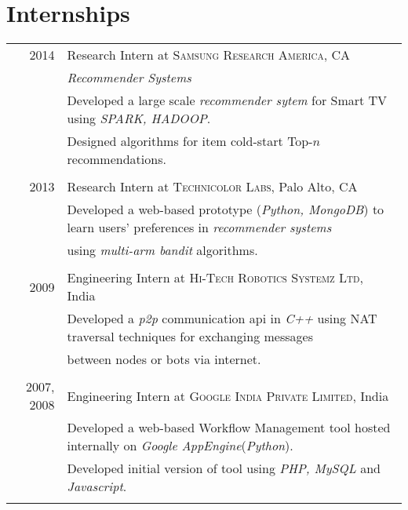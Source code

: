 \documentclass[a4paper,10pt]{article}
\begin{document}
\section{Internships}
\begin{tabular}{r|l}
  

  \textsc{2014} & Research Intern at \textsc{Samsung Research America}, CA\\
                       &\emph{Recommender Systems}\\
                       &\footnotesize{Developed a large scale \textit{recommender
                       sytem} for Smart TV using
                     \textit{SPARK, HADOOP}.}\\
                     & \footnotesize{Designed algorithms for 
                   item cold-start Top-$n$ recommendations.}\\\multicolumn{2}{c}{} \\

  \textsc{2013} & Research Intern at \textsc{Technicolor Labs}, Palo Alto, CA \\
                       &\footnotesize{Developed a web-based  prototype (\emph{Python,
                 MongoDB}) to learn users'
               preferences in \emph{recommender systems}}\\
               &\footnotesize{using
               \emph{multi-arm bandit} algorithms.} \\\multicolumn{2}{c}{} \\ %

  \textsc{2009 } & Engineering Intern at \textsc{Hi-Tech Robotics
                 Systemz Ltd}, India \\
                 &\footnotesize{Developed a \emph{p2p} communication api in
                 \emph{C++}
               using NAT traversal techniques for exchanging
             messages}\\ 
             &\footnotesize{between nodes or bots via internet.} \\\multicolumn{2}{c}{} \\

  \textsc{2007, 2008} & Engineering Intern at \textsc{Google India Private
             Limited}, India \\
              &\footnotesize{Developed a web-based Workflow Management
             tool hosted internally on \emph{Google AppEngine}(\emph{Python})}.\\
             &\footnotesize{Developed initial version of tool using \emph{PHP,
     MySQL} and \emph{Javascript}.} \\\multicolumn{2}{c}{} \\
  
\end{tabular}
\end{document}

